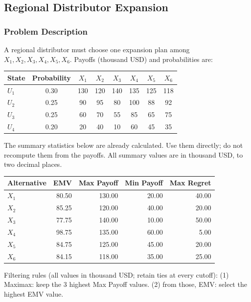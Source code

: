 
\subsection{Regional Distributor Expansion}\label{sec:c9-distributor}
\subsubsection*{Problem Description}
A regional distributor must choose one expansion plan among $X_1,X_2,X_3,X_4,X_5,X_6$.
Payoffs (thousand USD) and probabilities are:
\begin{center}
	\begin{tabular}{l c c c c c c c}
		\toprule
		State & Probability & $X_1$ & $X_2$ & $X_3$ & $X_4$ & $X_5$ & $X_6$ \\
		\midrule
		$U_1$ & 0.30 & 130 & 120 & 140 & 135 & 125 & 118 \\
		$U_2$ & 0.25 & 90 & 95 & 80 & 100 & 88 & 92 \\
		$U_3$ & 0.25 & 60 & 70 & 55 & 85 & 65 & 75 \\
		$U_4$ & 0.20 & 20 & 40 & 10 & 60 & 45 & 35 \\
		\bottomrule
	\end{tabular}
\end{center}
The summary statistics below are already calculated. Use them directly; do not recompute them from the payoffs. All summary values are in thousand USD, to two decimal places.
\begin{center}
\begin{tabular}{lrrrr}
\toprule
Alternative & EMV & Max Payoff & Min Payoff & Max Regret \\
\midrule
$X_1$ & 80.50 & 130.00 & 20.00 & 40.00 \\
$X_2$ & 85.25 & 120.00 & 40.00 & 20.00 \\
$X_3$ & 77.75 & 140.00 & 10.00 & 50.00 \\
$X_4$ & 98.75 & 135.00 & 60.00 & 5.00 \\
$X_5$ & 84.75 & 125.00 & 45.00 & 20.00 \\
$X_6$ & 84.15 & 118.00 & 35.00 & 25.00 \\
\bottomrule
\end{tabular}
\end{center}
Filtering rules (all values in thousand USD; retain ties at every cutoff):
(1) Maximax: keep the 3 highest Max Payoff values.
(2) from those, EMV: select the highest EMV value.

